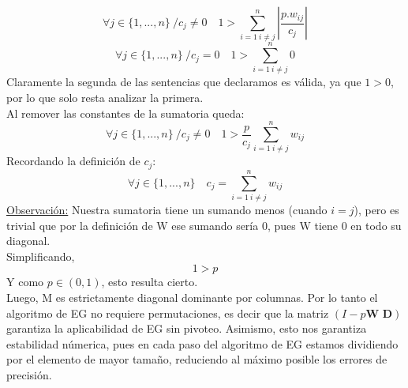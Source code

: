 \begin{equation}
\forall j \in \lbrace 1,...,n \rbrace \ / c_{j} \neq 0 \quad  1  >\sum _{ i = 1 \ i \neq j }^{ n }{ \left| \frac { p.{ w }_{ ij } }{ { c }_{ j } }  \right|  }
\end{equation}
\begin{equation}
\forall j \in  \lbrace 1,...,n \rbrace \ / c_{j} = 0 \quad  1  >\sum _{ i = 1 \ i \neq j }^{ n }{ 0 }
\end{equation}
Claramente la segunda de las sentencias que declaramos es v\'alida, ya que $1 > 0$, por lo que solo resta analizar la primera. \\
Al remover las constantes de la sumatoria queda:
\begin{equation*}
\forall j \in \lbrace 1,...,n \rbrace \ / c_{j} \neq 0 \quad  1  >\frac{p}{c_{j}} \sum _{ i = 1 \ i \neq j }^{ n }{ w_{ij} }
\end{equation*}
Recordando la definici\'on de $c_{j}$:
\begin{equation*}
\forall j \in \lbrace 1,...,n \rbrace \quad c_{j} = \sum _{ i = 1 \ i \neq j }^{ n }{ w_{ij} }
\end{equation*}
\underline{Observaci\'on:} Nuestra sumatoria tiene un sumando menos (cuando $i = j$), pero es trivial que por la definici\'on de W ese sumando ser\'ia $0$, pues W tiene $0$ en todo su diagonal.\\
Simplificando,
\begin{equation*}
1 > p
\end{equation*}
Y como $p \in (0,1)$, esto resulta cierto.\\
Luego, M es estrictamente diagonal dominante por columnas. Por lo tanto el algoritmo de EG no requiere permutaciones, es decir que la matriz $(\textit{I} - \textit{p} \textbf{W D})$ garantiza la aplicabilidad de EG sin pivoteo. Asimismo, esto nos garantiza estabilidad n\'umerica, pues en cada paso del algoritmo de EG estamos dividiendo por el elemento de mayor tamaño, reduciendo al m\'aximo posible los errores de precisi\'on.\\
\\
\\
